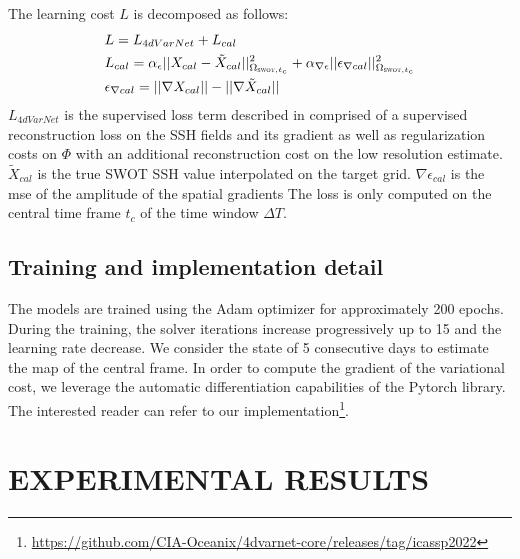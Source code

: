 \documentclass{article}
\begin{document}
The learning cost $L$ is decomposed as follows:
\begin{equation}
	\begin{split}
		& L = L_{4dVarNet} + L_{cal} \\
		& L_{cal} = \alpha_{\epsilon}||X_{cal} - \tilde{X}_{cal}||^2_{\Omega_{\textsc{swot}, t_c}} + \alpha_{\nabla\epsilon}||\epsilon_{\nabla cal}||^2_{\Omega_{\textsc{swot}, t_c}} \\
		& \epsilon_{\nabla cal} = ||\nabla X_{cal}|| - ||\nabla\tilde{X}_{cal}||
	\end{split}
	\label{eqn:loss}
\end{equation}
$L_{4dVarNet}$ is the supervised loss term described in \cite{e2e4dvar} comprised of a supervised reconstruction loss on the SSH fields and its gradient as well as regularization costs on $\Phi$  with an additional reconstruction cost on the low resolution estimate. $\tilde{X}_{cal}$ is the true SWOT SSH value interpolated on the target grid. $\nabla\epsilon_{cal}$ is the mse of the amplitude of the spatial gradients
The loss is only computed on the central time frame $t_c$ of the time window $\Delta T$.

\subsection{Training and implementation detail}

The models are trained using the Adam optimizer \cite{kingma2014adam} for approximately 200 epochs. During the training, the solver iterations increase progressively up to 15 and the learning rate decrease. 
We consider the state of 5 consecutive days to estimate the map of the central frame.
In order to compute the gradient of the variational cost, we leverage the automatic differentiation capabilities of the Pytorch library.
The interested reader can refer to our implementation\footnote{\url{https://github.com/CIA-Oceanix/4dvarnet-core/releases/tag/icassp2022}}.

\section{EXPERIMENTAL RESULTS}
\end{document}

